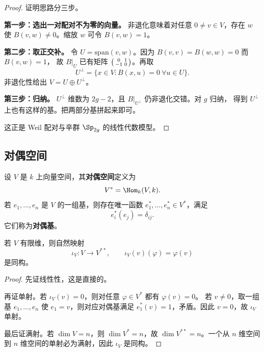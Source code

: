 \begin{proof}
证明思路分三步。

\textbf{第一步：选出一对配对不为零的向量。}
非退化意味着对任意 $0\neq v\in V$，存在 $w$ 使 $B(v,w)\neq 0$。缩放 $w$ 可令
$B(v,w)=1$。

\textbf{第二步：取正交补。}
令 $U=\mathrm{span}(v,w)$。因为 $B(v,v)=B(w,w)=0$ 而 $B(v,w)=1$，
故 $B|_U$ 已有矩阵 $\begin{psmallmatrix}0&1\\-1&0\end{psmallmatrix}$。再取
\[
  U^{\perp}=\{x\in V:B(x,u)=0\ \forall u\in U\}.
\]
非退化性给出 $V=U\oplus U^{\perp}$。

\textbf{第三步：归纳。}
$U^{\perp}$ 维数为 $2g-2$，且 $B|_{U^{\perp}}$ 仍非退化交错。对 $g$ 归纳，
得到 $U^{\perp}$ 上也有这样的基。把两部分基拼起来即可。

这正是 Weil 配对与辛群 $\Sp_{2g}$ 的线性代数模型。
\end{proof}

\subsection{对偶空间}

\begin{definition}[对偶空间与对偶基]
设 $V$ 是 $k$ 上向量空间，其\textbf{对偶空间}定义为
\begin{equation}
  V^*=\Hom_k(V,k).
\end{equation}
若 $e_1,\dots,e_n$ 是 $V$ 的一组基，则存在唯一函数 $e_1^*,\dots,e_n^*\in V^*$，满足
\[
  e_i^*(e_j)=\delta_{ij}.
\]
它们称为\textbf{对偶基}。
\end{definition}

\begin{theorem}[有限维情形的自然同构]
若 $V$ 有限维，则自然映射
\begin{equation}
  \iota_V\colon V\to V^{**},
  \qquad
  \iota_V(v)(\varphi)=\varphi(v)
\end{equation}
是同构。
\end{theorem}

\begin{proof}
先证线性性，这是直接的。

再证单射。若 $\iota_V(v)=0$，则对任意 $\varphi\in V^*$ 都有 $\varphi(v)=0$。
若 $v\neq 0$，取一组基 $e_1,\dots,e_n$ 使 $e_1=v$，则对应对偶基满足
$e_1^*(v)=1$，矛盾。因此 $v=0$，故 $\iota_V$ 单射。

最后证满射。若 $\dim V=n$，则 $\dim V^*=n$，故 $\dim V^{**}=n$。一个从 $n$ 维空间到
$n$ 维空间的单射必为满射，因此 $\iota_V$ 是同构。
\end{proof}

